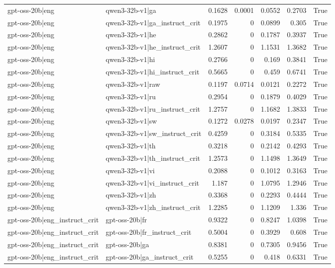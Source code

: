 \begin{table}
\begin{tabular}{l l r r r r l}
gpt-oss-20b|eng & qwen3-32b-v1|ga & 0.1628 & 0.0001 & 0.0552 & 0.2703 & True \\
gpt-oss-20b|eng & qwen3-32b-v1|ga_instruct_crit & 0.1975 & 0 & 0.0899 & 0.305 & True \\
gpt-oss-20b|eng & qwen3-32b-v1|he & 0.2862 & 0 & 0.1787 & 0.3937 & True \\
gpt-oss-20b|eng & qwen3-32b-v1|he_instruct_crit & 1.2607 & 0 & 1.1531 & 1.3682 & True \\
gpt-oss-20b|eng & qwen3-32b-v1|hi & 0.2766 & 0 & 0.169 & 0.3841 & True \\
gpt-oss-20b|eng & qwen3-32b-v1|hi_instruct_crit & 0.5665 & 0 & 0.459 & 0.6741 & True \\
gpt-oss-20b|eng & qwen3-32b-v1|raw & 0.1197 & 0.0714 & 0.0121 & 0.2272 & True \\
gpt-oss-20b|eng & qwen3-32b-v1|ru & 0.2954 & 0 & 0.1879 & 0.4029 & True \\
gpt-oss-20b|eng & qwen3-32b-v1|ru_instruct_crit & 1.2757 & 0 & 1.1682 & 1.3833 & True \\
gpt-oss-20b|eng & qwen3-32b-v1|sw & 0.1272 & 0.0278 & 0.0197 & 0.2347 & True \\
gpt-oss-20b|eng & qwen3-32b-v1|sw_instruct_crit & 0.4259 & 0 & 0.3184 & 0.5335 & True \\
gpt-oss-20b|eng & qwen3-32b-v1|th & 0.3218 & 0 & 0.2142 & 0.4293 & True \\
gpt-oss-20b|eng & qwen3-32b-v1|th_instruct_crit & 1.2573 & 0 & 1.1498 & 1.3649 & True \\
gpt-oss-20b|eng & qwen3-32b-v1|vi & 0.2088 & 0 & 0.1012 & 0.3163 & True \\
gpt-oss-20b|eng & qwen3-32b-v1|vi_instruct_crit & 1.187 & 0 & 1.0795 & 1.2946 & True \\
gpt-oss-20b|eng & qwen3-32b-v1|zh & 0.3368 & 0 & 0.2293 & 0.4444 & True \\
gpt-oss-20b|eng & qwen3-32b-v1|zh_instruct_crit & 1.2285 & 0 & 1.1209 & 1.336 & True \\
gpt-oss-20b|eng_instruct_crit & gpt-oss-20b|fr & 0.9322 & 0 & 0.8247 & 1.0398 & True \\
gpt-oss-20b|eng_instruct_crit & gpt-oss-20b|fr_instruct_crit & 0.5004 & 0 & 0.3929 & 0.608 & True \\
gpt-oss-20b|eng_instruct_crit & gpt-oss-20b|ga & 0.8381 & 0 & 0.7305 & 0.9456 & True \\
gpt-oss-20b|eng_instruct_crit & gpt-oss-20b|ga_instruct_crit & 0.5255 & 0 & 0.418 & 0.6331 & True \\

\end{tabular}
\end{table}
